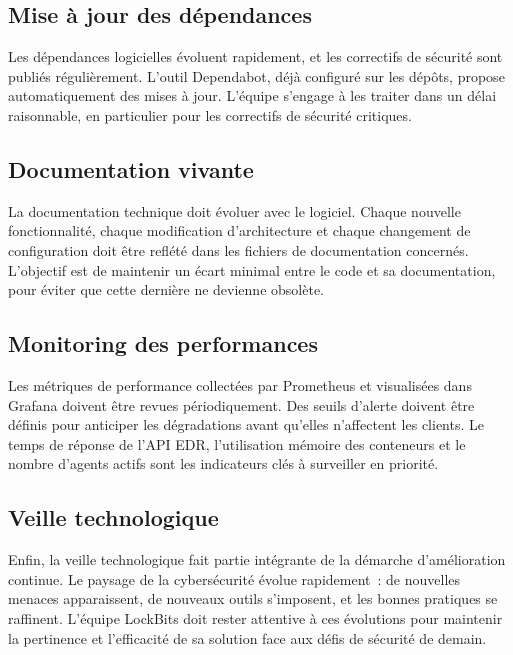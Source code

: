 \subsection{Mise à jour des dépendances}
Les dépendances logicielles
évoluent rapidement, et les correctifs de sécurité sont publiés
régulièrement. L'outil Dependabot, déjà configuré sur les dépôts,
propose automatiquement des mises à jour. L'équipe s'engage à les
traiter dans un délai raisonnable, en particulier pour les correctifs
de sécurité critiques.

\subsection{Documentation vivante}
La documentation technique doit évoluer
avec le logiciel. Chaque nouvelle fonctionnalité, chaque modification
d'architecture et chaque changement de configuration doit être reflété
dans les fichiers de documentation concernés. L'objectif est de
maintenir un écart minimal entre le code et sa documentation, pour
éviter que cette dernière ne devienne obsolète.

\subsection{Monitoring des performances}
\textbf{} Les métriques de performance
collectées par Prometheus et visualisées dans Grafana doivent être
revues périodiquement. Des seuils d'alerte doivent être définis pour
anticiper les dégradations avant qu'elles n'affectent les clients. Le
temps de réponse de l'API EDR, l'utilisation mémoire des conteneurs et
le nombre d'agents actifs sont les indicateurs clés à surveiller en
priorité.

\subsection{Veille technologique}
Enfin, la veille technologique fait partie intégrante de la démarche
d'amélioration continue. Le paysage de la cybersécurité évolue
rapidement~: de nouvelles menaces apparaissent, de nouveaux outils
s'imposent, et les bonnes pratiques se raffinent. L'équipe LockBits
doit rester attentive à ces évolutions pour maintenir la pertinence et
l'efficacité de sa solution face aux défis de sécurité de demain.
